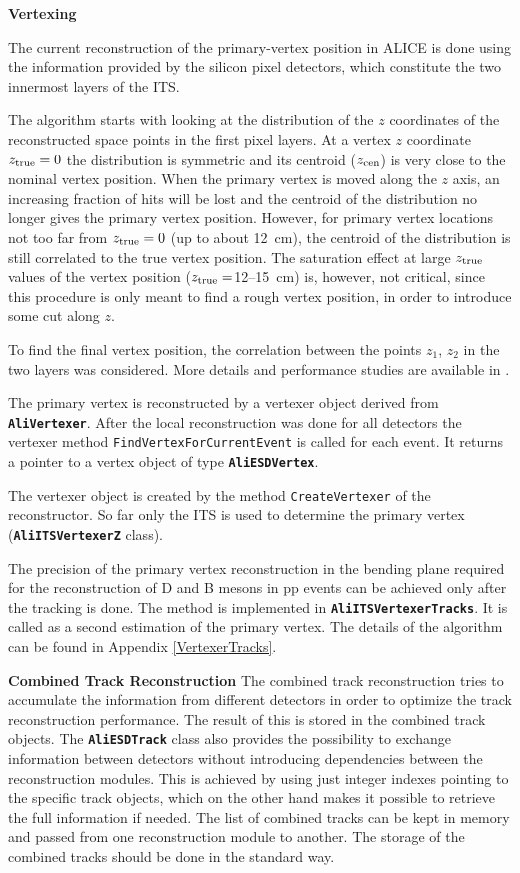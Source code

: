 \documentclass[12pt,a4paper,twoside]{article}
\newcommand{\class}[1]{\texttt{\textbf{#1}}\xspace}
\newcommand{\method}[1]{\texttt{#1}\xspace}
\begin{document}
\noindent
\textbf{Vertexing}

The current reconstruction of the primary-vertex 
position in ALICE is done using the information provided by the 
silicon pixel detectors, which constitute the two innermost layers of the 
ITS.

The algorithm starts with looking at the
distribution of the $z$ coordinates of the reconstructed space points 
in the first pixel layers.
At a vertex $z$ coordinate $z_{\rm true} = 0$ the distribution is 
symmetric and 
its centroid ($z_{\rm cen}$) is very close to the nominal
vertex position. When the primary vertex is moved along the $z$ axis, an 
increasing fraction
of hits will be lost and the centroid of the distribution no longer gives
the primary
vertex position. However, for primary vertex locations not too far from 
$z_{\rm true} = 0$ 
(up to about 12~cm), the centroid of the distribution is still correlated to 
the true vertex position.
The saturation effect at large $z_{\rm true}$ values of the vertex position 
($z_{\rm true} = $12--15~cm) 
is, however, not critical, since this procedure is only meant to find a rough 
vertex position, in order to introduce some cut along $z$.

To find the final vertex position,
the correlation between the points $z_1$, $z_2$ in the two layers
was considered. More details and performance studies are available in
\cite{PPRVII}.

The primary vertex is reconstructed by a vertexer object derived from
\class{AliVertexer}. After the local reconstruction was done for all detectors
the vertexer method \method{FindVertexForCurrentEvent} is called for each
event. It returns a pointer to a vertex object of type \class{AliESDVertex}.

The vertexer object is created by the method \method{CreateVertexer} of the
reconstructor. So far only the ITS is used to determine the primary
vertex (\class{AliITSVertexerZ} class).

The precision of the primary vertex reconstruction in the bending plane 
required for the reconstruction of D and B mesons in pp events
can be achieved only after the tracking is done. The method is
implemented in \class{AliITSVertexerTracks}. It is called as a second
estimation of the primary vertex. The details of the algorithm can be
found in Appendix \ref{VertexerTracks}.

\noindent
\textbf{Combined Track Reconstruction}
The combined track reconstruction tries to accumulate the information from
different detectors in order to optimize the track reconstruction performance. 
The result of this is stored in the combined track objects.
The \class{AliESDTrack} class also
provides the possibility to exchange information between detectors
without introducing dependencies between the reconstruction modules. 
This is achieved by using just integer indexes pointing to the
specific track objects, which on the other hand makes it possible to
retrieve the full information if needed. 
The list of combined tracks can be kept in memory and passed from one
reconstruction module to another. 
The storage of the combined tracks should be done in the standard way.
\end{document}
